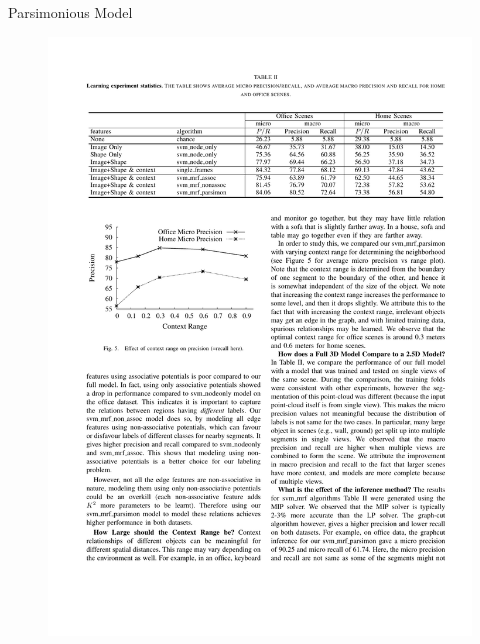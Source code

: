 \documentclass{beamer}
\begin{document}
\begin{frame}{Parsimonious Model}
\begin{figure}
\includegraphics[width=\linewidth]{table3_1.pdf}\\

\end{figure}
\end{frame}
\end{document}
